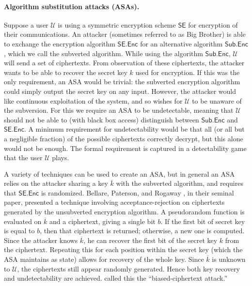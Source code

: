 \paragraph{Algorithm substitution attacks (ASAs).} Suppose a user $\mathcal{U}$ is using a symmetric encryption scheme $\mathsf{SE}$ for encryption of their communications. An attacker (sometimes referred to as Big Brother) is able to exchange the encryption algorithm $\mathsf{SE.Enc}$ for an alternative algorithm $\mathsf{Sub.Enc}$, which we call the subverted algorithm. While using the algorithm $\mathsf{Sub.Enc}$, $\mathcal{U}$ will send a set of ciphertexts. From observation of these ciphertexts, the attacker wants to be able to recover the secret key $k$ used for encryption. If this was the only requirement, an ASA would be trivial: the subverted encryption algorithm could simply output the secret key on any input. However, the attacker would like continuous exploitation of the system, and so wishes for $\mathcal{U}$ to be unaware of the subversion. For this we require an ASA to be undetectable, meaning that $\mathcal{U}$ should not be able to (with black box access) distinguish between  $\mathsf{Sub.Enc}$ and $\mathsf{SE.Enc}$. A minimum requirement for undetectability would be that all (or all but a negligible fraction) of the possible ciphertexts correctly decrypt, but this alone would not be enough. The formal requirement is captured in a detectability game that the user $\mathcal{U}$ plays.

A variety of techniques can be used to create an ASA, but in general an ASA relies on the attacker sharing a key $\overline{k}$ with the subverted algorithm, and requires that $\mathsf{SE.Enc}$ is randomized. Bellare, Paterson, and Rogaway \cite{C:BelPatRog14}, in their seminal paper, presented a technique involving acceptance-rejection on ciphertexts generated by the unsubverted encryption algorithm. A pseudorandom function is evaluated on $\overline{k}$ and a ciphertext, giving a single bit $b$. If the first bit of secret key is equal to $b$, then that ciphertext is returned; otherwise, a new one is computed. Since the attacker knows $\overline{k}$, he can recover the first bit of the secret key $k$ from the ciphertext. Repeating this for each position within the secret key (which the ASA maintains as state) allows for recovery of the whole key. Since $\overline{k}$ is unknown to $\mathcal{U}$, the ciphertexts still appear randomly generated. Hence both key recovery and undetectability are achieved. \cite{C:BelPatRog14} called this the ``biased-ciphertext attack.''

